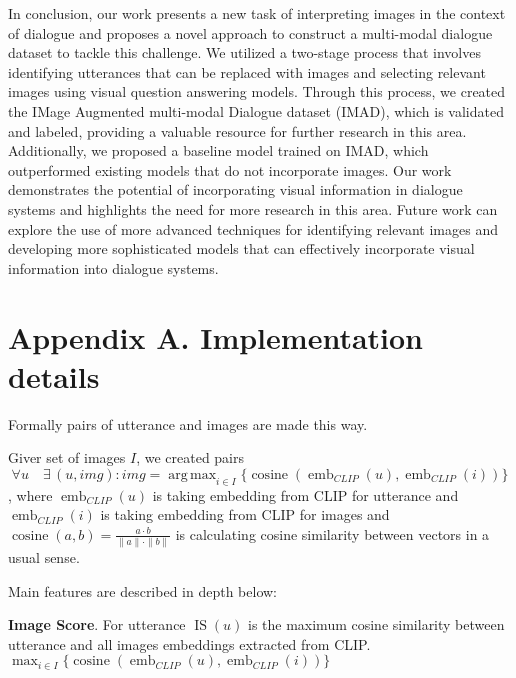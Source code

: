 \documentclass[11pt]{article}
\DeclareMathOperator*{\argmax}{arg\,max}
\begin{document}
In conclusion, our work presents a new task of interpreting images in the context of dialogue and proposes a novel approach to construct a multi-modal dialogue dataset to tackle this challenge. We utilized a two-stage process that involves identifying utterances that can be replaced with images and selecting relevant images using visual question answering models. Through this process, we created the IMage Augmented multi-modal Dialogue dataset (IMAD), which is validated and labeled, providing a valuable resource for further research in this area. Additionally, we proposed a baseline model trained on IMAD, which outperformed existing models that do not incorporate images. Our work demonstrates the potential of incorporating visual information in dialogue systems and highlights the need for more research in this area. Future work can explore the use of more advanced techniques for identifying relevant images and developing more sophisticated models that can effectively incorporate visual information into dialogue systems.







\pagebreak

\section*{Appendix A. Implementation details}

Formally pairs of utterance and images are made this way.

Giver set of images $I$, we created pairs $$\forall u \quad \exists \, (u,img): img = \displaystyle\argmax_{i \in I} \{\operatorname{cosine}(\operatorname{emb}_{CLIP}(u), \operatorname{emb}_{CLIP}(i))\}$$, where $\operatorname{emb}_{CLIP}(u)$ is taking embedding from CLIP for utterance and $\operatorname{emb}_{CLIP}(i)$ is taking embedding from CLIP for images and $\operatorname{cosine}(a,b) = \frac{a \cdot b}{ \| a \| \cdot \| b\|}$ is calculating cosine similarity between vectors in a usual sense.

Main features are described in depth below:

\textbf{Image Score}. For utterance $\operatorname{IS}(u)$ is the maximum cosine similarity between utterance and all images embeddings extracted from CLIP. $\displaystyle\max_{i \in I} \{\operatorname{cosine}(\operatorname{emb}_{CLIP}(u), \operatorname{emb}_{CLIP}(i))\}$
\end{document}
